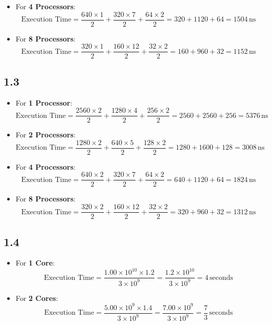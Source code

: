\documentclass[cn,12pt]{homework}
\begin{document}
\begin{solution}
\begin{itemize}
    \item For \textbf{4 Processors}:
    \[
    \text{Execution Time} = \frac{640 \times 1}{2} + \frac{320 \times 7}{2} + \frac{64 \times 2}{2} = 320 + 1120 + 64 = 1504 \, \text{ns}
    \]

    \item For \textbf{8 Processors}:
    \[
    \text{Execution Time} = \frac{320 \times 1}{2} + \frac{160 \times 12}{2} + \frac{32 \times 2}{2} = 160 + 960 + 32 = 1152 \, \text{ns}
    \]
\end{itemize}

\subsection*{1.3}
\begin{itemize}
    \item For \textbf{1 Processor}:
    \[
    \text{Execution Time} = \frac{2560 \times 2}{2} + \frac{1280 \times 4}{2} + \frac{256 \times 2}{2} = 2560 + 2560 + 256 = 5376 \, \text{ns}
    \]

    \item For \textbf{2 Processors}:
    \[
    \text{Execution Time} = \frac{1280 \times 2}{2} + \frac{640 \times 5}{2} + \frac{128 \times 2}{2} = 1280 + 1600 + 128 = 3008 \, \text{ns}
    \]

    \item For \textbf{4 Processors}:
    \[
    \text{Execution Time} = \frac{640 \times 2}{2} + \frac{320 \times 7}{2} + \frac{64 \times 2}{2} = 640 + 1120 + 64 = 1824 \, \text{ns}
    \]

    \item For \textbf{8 Processors}:
    \[
    \text{Execution Time} = \frac{320 \times 2}{2} + \frac{160 \times 12}{2} + \frac{32 \times 2}{2} = 320 + 960 + 32 = 1312 \, \text{ns}
    \]
\end{itemize}

\subsection*{1.4}

\begin{itemize}
    \item For \textbf{1 Core}:
    \[
    \text{Execution Time} = \frac{1.00 \times 10^{10} \times 1.2}{3 \times 10^9} = \frac{1.2 \times 10^{10}}{3 \times 10^9} = 4 \, \text{seconds}
    \]

    \item For \textbf{2 Cores}:
    \[
    \text{Execution Time} = \frac{5.00 \times 10^9 \times 1.4}{3 \times 10^9} = \frac{7.00 \times 10^9}{3 \times 10^9} = \frac{7}{3} \, \text{seconds}
    \]


\end{itemize}
\end{solution}
\end{document}
